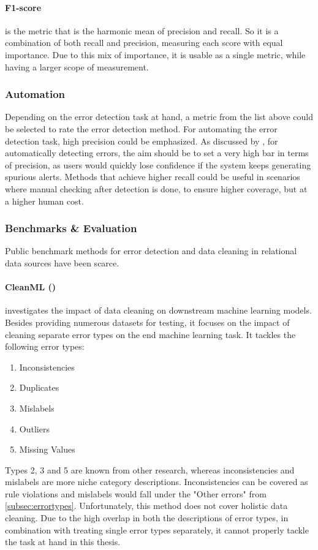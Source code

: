 \paragraph{F1-score}
is the metric that is the harmonic mean of precision and recall. So it is a combination of both recall and precision, measuring each score with equal importance. Due to this mix of importance, it is usable as a single metric, while having a larger scope of measurement.

\subsubsection{Automation}
Depending on the error detection task at hand, a metric from the list above could be selected to rate the error detection method. For automating the error detection task, high precision could be emphasized. 
As discussed by \cite{Huang2018-er}, for automatically detecting errors, the aim should be to set a very high bar in terms of
precision, as users would quickly lose confidence if the system keeps
generating spurious alerts. Methods that achieve higher recall could be useful in scenarios where manual checking after detection is done, to ensure higher coverage, but at a higher human cost.

\subsubsection{Benchmarks \& Evaluation}
Public benchmark methods for error detection and data cleaning in relational data sources have been scarce. 
\paragraph{CleanML (\cite{Li2019-ve})} investigates the impact of data cleaning on downstream machine learning models. Besides providing numerous datasets for testing, it focuses on the impact of cleaning separate error types on the end machine learning task. It tackles the following error types:
\begin{enumerate}
    \item Inconsistencies
    \item Duplicates
    \item Mislabels
    \item Outliers
    \item Missing Values
\end{enumerate}
Types 2, 3 and 5 are known from other research, whereas inconsistencies and mislabels are more niche category descriptions. Inconsistencies can be covered as rule violations and mislabels would fall under the "Other errors" from \autoref{subsec:errortypes}. Unfortunately, this method does not cover holistic data cleaning. Due to the high overlap in both the descriptions of error types, in combination with treating single error types separately, it cannot properly tackle the task at hand in this thesis.

